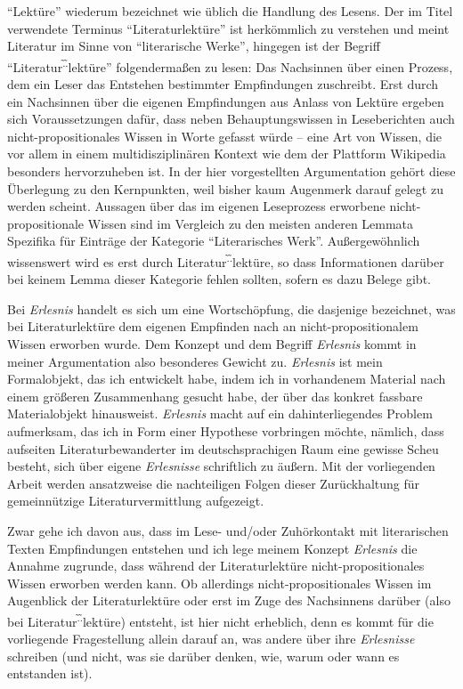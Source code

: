\documentclass[fontsize=12pt]{scrartcl}
\begin{document}
"`Lekt\"ure"' wiederum be\-zeichnet wie \"ublich die Handlung des Lesens. Der im Titel verwendete Terminus "`Li\-te\-ra\-tur\-lekt\"ure"' ist herk\"ommlich zu verstehen und meint Li\-te\-ra\-tur im Sinne von "`li\-te\-ra\-rische Werke"', hingegen ist der Begriff "`Li\-te\-ra\-tur\textsuperscript{\~.\~.}lek\-t\"u\-re"' folgenderma{\ss}en zu lesen: Das Nachsinnen \"uber einen Prozess, dem ein Leser\textsuperscript{\tiny *} das Entstehen bestimmter Emp\-fin\-dun\-gen zuschreibt. Erst durch ein Nachsinnen \"uber die eigenen Emp\-fin\-dun\-gen aus Anlass von Lekt\"ure ergeben sich Voraussetzungen daf\"ur, dass neben Behauptungswissen in Leseberichten auch nicht-pro\-po\-si\-ti\-o\-na\-les Wissen in Worte gefasst w\"urde -- eine Art von Wissen, die vor allem in einem multidisziplin\"aren Kontext wie dem der Plattform Wi\-ki\-pe\-dia besonders hervorzuheben ist. In der \mbox{hier} vorgestellten Argumentation geh\"ort diese \"Uberlegung zu den Kernpunkten, weil bis\-her kaum Augenmerk darauf gelegt zu werden scheint. Aussagen \"uber das im eigenen Leseprozess erworbene nicht-pro\-po\-si\-ti\-o\-na\-le Wissen sind im Vergleich zu den meisten anderen Lemmata Spezifika f\"ur Eintr\"age der Kategorie "`Li\-te\-ra\-risches Werk"'. Au{\ss}ergew\"ohnlich wissenswert wird es erst durch Li\-te\-ra\-tur\textsuperscript{\~.\~.}lekt\"ure, so dass Informationen dar\"uber bei keinem Lemma dieser Kategorie fehlen sollten, sofern es dazu Belege gibt.

Bei \textit{Erlesnis} handelt es sich um eine Wortsch\"opfung, die dasjenige be\-zeichnet, was bei Li\-te\-ra\-tur\-lekt\"ure dem eigenen Empfinden nach an nicht-pro\-po\-si\-ti\-o\-na\-lem Wissen erworben wurde. Dem Konzept und dem Begriff \textit{Erlesnis} kommt in meiner Argumentation also besonderes Gewicht zu. \textit{Erlesnis} ist mein Formalobjekt, das ich ent\-wickelt habe, indem ich in vorhandenem Material nach einem gr\"o{\ss}eren Zusammenhang gesucht habe, der \"uber das konkret fassbare Materialobjekt hinausweist. \textit{Erlesnis} macht auf ein dahinterliegendes Pro\-blem aufmerksam, das ich in Form einer Hypothese vorbringen m\"ochte, n\"amlich, dass aufsei\-ten Li\-te\-ra\-tur\-bewanderter im deutschspra\-chi\-gen Raum eine gewisse Scheu be\-steht, sich \"uber eigene \textit{Erlesnisse} schriftlich zu \"au{\ss}ern. Mit der vorliegenden Arbeit werden ansatzweise die nachteiligen Folgen dieser Zur\"uckhaltung f\"ur gemeinn\"utzige Li\-te\-ra\-tur\-ver\-mitt\-lung aufgezeigt. 

Zwar gehe ich davon aus, dass im Lese- und/oder Zuh\"orkontakt mit li\-te\-ra\-rischen Texten Emp\-fin\-dun\-gen entstehen und ich lege meinem Konzept \textit{Erlesnis} die Annahme zugrunde, dass w\"ahrend der Li\-te\-ra\-tur\-lekt\"ure nicht-pro\-po\-si\-ti\-o\-na\-les Wissen erworben werden kann. Ob al\-ler\-dings nicht-pro\-po\-si\-ti\-o\-na\-les Wissen im Augenblick der Li\-te\-ra\-tur\-lekt\"ure oder erst im Zuge des Nachsinnens dar\"uber (also bei Li\-te\-ra\-tur\textsuperscript{\~.\~.}lekt\"ure) entsteht, ist \mbox{hier} nicht erheblich, denn es kommt f\"ur die vorliegende Fragestellung allein darauf an, was andere \"uber ihre \textit{Erlesnisse} schrei\-ben (und nicht, was sie dar\"uber denken, wie, warum oder wann es entstanden ist). 
\end{document}

